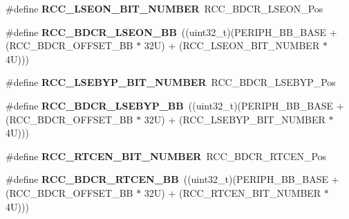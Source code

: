 \begin{DoxyCompactItemize}
\item 
\mbox{\label{group___r_c_c___bit_address___alias_region_ga16e388a406aa93969e2713dd2e0d43e7}} 
\#define {\bfseries R\+C\+C\+\_\+\+L\+S\+E\+O\+N\+\_\+\+B\+I\+T\+\_\+\+N\+U\+M\+B\+ER}~R\+C\+C\+\_\+\+B\+D\+C\+R\+\_\+\+L\+S\+E\+O\+N\+\_\+\+Pos
\item 
\mbox{\label{group___r_c_c___bit_address___alias_region_gaf8dc69c1e125aaaba41c6e2f9e2121be}} 
\#define {\bfseries R\+C\+C\+\_\+\+B\+D\+C\+R\+\_\+\+L\+S\+E\+O\+N\+\_\+\+BB}~((uint32\+\_\+t)(P\+E\+R\+I\+P\+H\+\_\+\+B\+B\+\_\+\+B\+A\+SE + (R\+C\+C\+\_\+\+B\+D\+C\+R\+\_\+\+O\+F\+F\+S\+E\+T\+\_\+\+BB $\ast$ 32\+U) + (\+R\+C\+C\+\_\+\+L\+S\+E\+O\+N\+\_\+\+B\+I\+T\+\_\+\+N\+U\+M\+B\+E\+R $\ast$ 4\+U)))
\item 
\mbox{\label{group___r_c_c___bit_address___alias_region_ga099cfa567c89f8643f7671d84ba18a7b}} 
\#define {\bfseries R\+C\+C\+\_\+\+L\+S\+E\+B\+Y\+P\+\_\+\+B\+I\+T\+\_\+\+N\+U\+M\+B\+ER}~R\+C\+C\+\_\+\+B\+D\+C\+R\+\_\+\+L\+S\+E\+B\+Y\+P\+\_\+\+Pos
\item 
\mbox{\label{group___r_c_c___bit_address___alias_region_gaf47f797e830f0ed3209a792cf96bf8fc}} 
\#define {\bfseries R\+C\+C\+\_\+\+B\+D\+C\+R\+\_\+\+L\+S\+E\+B\+Y\+P\+\_\+\+BB}~((uint32\+\_\+t)(P\+E\+R\+I\+P\+H\+\_\+\+B\+B\+\_\+\+B\+A\+SE + (R\+C\+C\+\_\+\+B\+D\+C\+R\+\_\+\+O\+F\+F\+S\+E\+T\+\_\+\+BB $\ast$ 32\+U) + (\+R\+C\+C\+\_\+\+L\+S\+E\+B\+Y\+P\+\_\+\+B\+I\+T\+\_\+\+N\+U\+M\+B\+E\+R $\ast$ 4\+U)))
\item 
\mbox{\label{group___r_c_c___bit_address___alias_region_gac4074d20c157f0892c6effb8bf22c8d7}} 
\#define {\bfseries R\+C\+C\+\_\+\+R\+T\+C\+E\+N\+\_\+\+B\+I\+T\+\_\+\+N\+U\+M\+B\+ER}~R\+C\+C\+\_\+\+B\+D\+C\+R\+\_\+\+R\+T\+C\+E\+N\+\_\+\+Pos
\item 
\mbox{\label{group___r_c_c___bit_address___alias_region_ga583ba8653153b48a06473d0a331f781d}} 
\#define {\bfseries R\+C\+C\+\_\+\+B\+D\+C\+R\+\_\+\+R\+T\+C\+E\+N\+\_\+\+BB}~((uint32\+\_\+t)(P\+E\+R\+I\+P\+H\+\_\+\+B\+B\+\_\+\+B\+A\+SE + (R\+C\+C\+\_\+\+B\+D\+C\+R\+\_\+\+O\+F\+F\+S\+E\+T\+\_\+\+BB $\ast$ 32\+U) + (\+R\+C\+C\+\_\+\+R\+T\+C\+E\+N\+\_\+\+B\+I\+T\+\_\+\+N\+U\+M\+B\+E\+R $\ast$ 4\+U)))

\end{DoxyCompactItemize}
